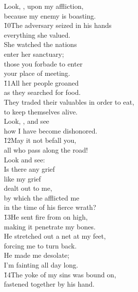 \begin{poetry}
\poeml Look, , upon my affliction, \\
\poemll    because my enemy is boasting. \\
\poeml \v{10}The adversary seized in his hands \\
\poemll    everything she valued. \\
\poeml She watched the nations \\
\poemll    enter her sanctuary; \\
\poeml those you forbade to enter \\
\poemll    your place of meeting. \\
\poeml \v{11}All her people groaned \\
\poemll    as they searched for food. \\
\poeml They traded their valuables in order to eat, \\
\poemll    to keep themselves alive. \\
\poeml Look, , and see \\
\poemll    how I have become dishonored. \\
\poeml \v{12}May it not befall you, \\
\poemll    all who pass along the road! \\
\poeml Look and see: \\
\poemll    Is there any grief \\
\poeml like my grief \\
\poemll    dealt out to me, \\
\poeml by which the  afflicted me \\
\poemll    in the time of his fierce wrath? \\
\poeml \v{13}He sent fire from on high, \\
\poemll    making it penetrate my bones. \\
\poeml He stretched out a net at my feet, \\
\poemll    forcing me to turn back. \\
\poeml He made me desolate; \\
\poemll    I'm fainting all day long. \\
\poeml \v{14}The yoke of my sins was bound on, \\
\poemll    fastened together by his hand. \\

\end{poetry}
